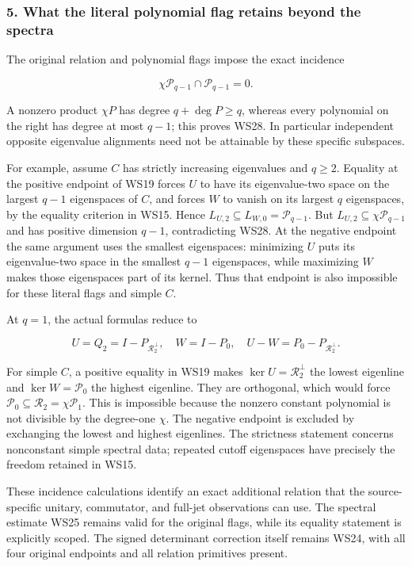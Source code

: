 \documentclass{article}
\begin{document}
\subsubsection{5. What the literal polynomial flag retains beyond the spectra}\label{endpoint-window_review--what-the-literal-polynomial-flag-retains-beyond-the-spectra}

The original relation and polynomial flags impose the exact incidence

\[
\chi\mathcal P_{q-1}\cap\mathcal P_{q-1}=0.
\tag{WS28}
\]

A nonzero product \(\chi P\) has degree \(q+\deg P\ge q\), whereas every polynomial on the right has degree at most \(q-1\); this proves WS28. In particular independent opposite eigenvalue alignments need not be attainable by these specific subspaces.

For example, assume \(C\) has strictly increasing eigenvalues and \(q\ge2\). Equality at the positive endpoint of WS19 forces \(U\) to have its eigenvalue-two space on the largest \(q-1\) eigenspaces of \(C\), and forces \(W\) to vanish on its largest \(q\) eigenspaces, by the equality criterion in WS15. Hence \(L_{U,2}\subseteq L_{W,0}=\mathcal P_{q-1}\). But \(L_{U,2}\subseteq\chi\mathcal P_{q-1}\) and has positive dimension \(q-1\), contradicting WS28. At the negative endpoint the same argument uses the smallest eigenspaces: minimizing \(U\) puts its eigenvalue-two space in the smallest \(q-1\) eigenspaces, while maximizing \(W\) makes those eigenspaces part of its kernel. Thus that endpoint is also impossible for these literal flags and simple \(C\).

At \(q=1\), the actual formulas reduce to

\[
U=Q_2=I-P_{\mathcal R_2^\perp},
\quad W=I-P_0,
\quad U-W=P_0-P_{\mathcal R_2^\perp}.
\tag{WS29}
\]

For simple \(C\), a positive equality in WS19 makes \(\ker U=\mathcal R_2^\perp\) the lowest eigenline and \(\ker W=\mathcal P_0\) the highest eigenline. They are orthogonal, which would force \(\mathcal P_0\subseteq\mathcal R_2=\chi\mathcal P_1\). This is impossible because the nonzero constant polynomial is not divisible by the degree-one \(\chi\). The negative endpoint is excluded by exchanging the lowest and highest eigenlines. The strictness statement concerns nonconstant simple spectral data; repeated cutoff eigenspaces have precisely the freedom retained in WS15.

These incidence calculations identify an exact additional relation that the source-specific unitary, commutator, and full-jet observations can use. The spectral estimate WS25 remains valid for the original flags, while its equality statement is explicitly scoped. The signed determinant correction itself remains WS24, with all four original endpoints and all relation primitives present.
\end{document}

